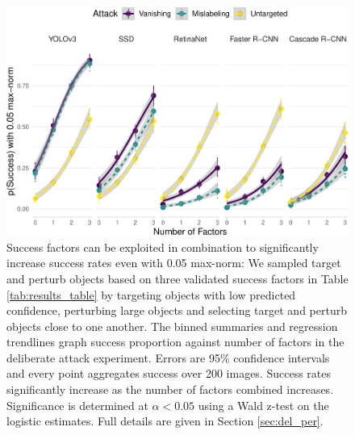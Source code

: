 \begin{figure}[tb]

{\centering \includegraphics[width=1\linewidth]{imgs/biased_trend_graph-normed} 

}

\caption{Success factors can be exploited in combination to significantly increase success rates even with 0.05 max-norm:  We sampled target and perturb objects based on three validated success factors in Table \ref{tab:results_table} by targeting objects with low predicted confidence, perturbing large objects and selecting target and perturb objects close to one another. The binned summaries and regression trendlines graph success proportion against number of factors in the deliberate attack experiment. Errors are 95\% confidence intervals and every point aggregates success over 200 images. Success rates significantly increase as the number of factors combined increases. Significance is determined at $\alpha < 0.05$ using a Wald z-test on the logistic estimates. Full details are given in Section \ref{sec:del_per}.}\label{fig:biased_trend_graph_normed}
\end{figure}

